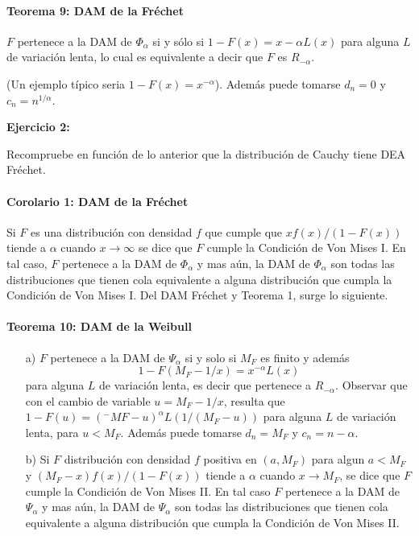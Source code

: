 \documentclass[
  oneside]{book}
\begin{document}
\hypertarget{teorema-9-dam-de-la-fruxe9chet}{%
\paragraph{Teorema 9: DAM de la
Fréchet}\label{teorema-9-dam-de-la-fruxe9chet}}

\(F\) pertenece a la DAM de \(\Phi_{\alpha}\) si y sólo si
\(1-F(x)=x-\alpha L(x)\) para alguna \(L\) de variación lenta, lo cual
es equivalente a decir que \(F\) es \(R_{-\alpha}\).

(Un ejemplo típico seria \(1-F(x)=x^{-\alpha}\)). Además puede tomarse
\(d_n=0\) y \(c_n= n^{1/\alpha}\).

\textbf{Ejercicio 2:}

Recompruebe en función de lo anterior que la distribución de Cauchy
tiene DEA Fréchet.

\hypertarget{corolario-1-dam-de-la-fruxe9chet}{%
\paragraph{Corolario 1: DAM de la
Fréchet}\label{corolario-1-dam-de-la-fruxe9chet}}

Si \(F\) es una distribución con densidad \(f\) que cumple que
\(xf(x)/(1-F(x))\) tiende a \(\alpha\) cuando \(x \rightarrow \infty\)
se dice que \(F\) cumple la Condición de Von Mises I. En tal caso, \(F\)
pertenece a la DAM de \(\Phi_{\alpha}\) y mas aún, la DAM de
\(\Phi_{\alpha}\) son todas las distribuciones que tienen cola
equivalente a alguna distribución que cumpla la Condición de Von Mises
I. Del DAM Fréchet y Teorema 1, surge lo siguiente.

\hypertarget{teorema-10-dam-de-la-weibull}{%
\paragraph{Teorema 10: DAM de la
Weibull}\label{teorema-10-dam-de-la-weibull}}

\begin{itemize}
\item [a)] $F$ pertenece a la DAM de $\Psi_{\alpha}$ si y solo si $M_F$ es finito y además $$1-F(M_F -1/x)=x^{-\alpha} L(x)$$ para alguna
$L$ de variación lenta, es decir que pertenece a $R_{-\alpha}$. Observar que con el cambio de variable $u=M_F -1/x$,
resulta que $1-F(u)=(^{-}MF -u)^{\alpha} L(1/(M_F -u))$ para alguna $L$ de variación lenta, para $u< M_F$. Además puede tomarse $d_n= M_F$ y $c_n= n-\alpha$.
\item [b)] Si $F$ distribución con densidad $f$ positiva en $(a,M_F)$ para algun $a< M_F$ y $(M_F -x)f(x)/(1-F(x))$ tiende a $\alpha$ cuando $x\rightarrow M_F$, se dice que $F$ cumple la Condición de Von Mises II. En tal caso $F$ pertenece a la DAM de $\Psi_{\alpha}$ y mas aún, la DAM de $\Psi_{\alpha}$ son todas las distribuciones que tienen cola equivalente a alguna distribución que cumpla la Condición de Von Mises II.
\end{itemize}
\end{document}
